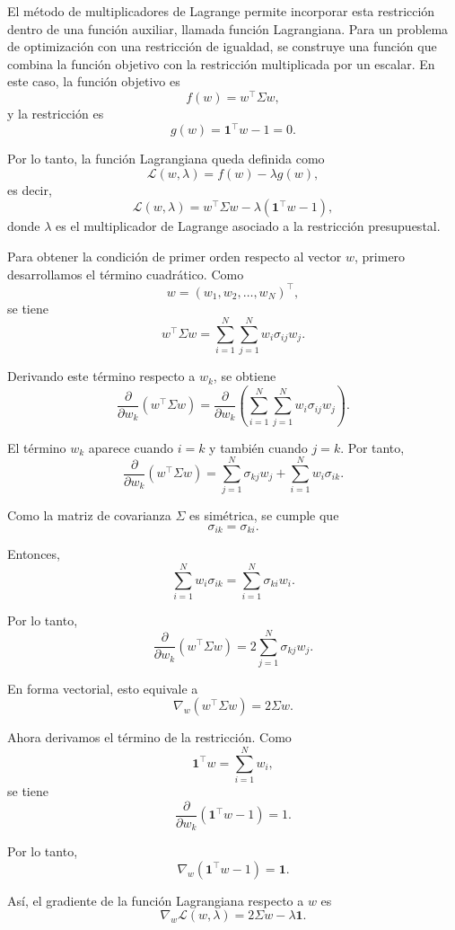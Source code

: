 \documentclass[letterpaper,12pt,oneside]{book}
\begin{document}
El método de multiplicadores de Lagrange permite incorporar esta restricción dentro de una función auxiliar, llamada función Lagrangiana. Para un problema de optimización con una restricción de igualdad, se construye una función que combina la función objetivo con la restricción multiplicada por un escalar. En este caso, la función objetivo es
\[
f(w)=w^\top \Sigma w,
\]
y la restricción es
\[
g(w)=\mathbf{1}^\top w - 1 = 0.
\]

Por lo tanto, la función Lagrangiana queda definida como
\[
\mathcal{L}(w,\lambda)
=
f(w)-\lambda g(w),
\]
es decir,
\[
\mathcal{L}(w,\lambda)
=
w^\top \Sigma w
-
\lambda(\mathbf{1}^\top w - 1),
\]
donde \(\lambda\) es el multiplicador de Lagrange asociado a la restricción presupuestal.

Para obtener la condición de primer orden respecto al vector \(w\), primero desarrollamos el término cuadrático. Como
\[
w =
(w_1,w_2,\dots,w_N)^\top,
\]
se tiene
\[
w^\top \Sigma w
=
\sum_{i=1}^N
\sum_{j=1}^N
w_i \sigma_{ij} w_j.
\]

Derivando este término respecto a \(w_k\), se obtiene
\[
\frac{\partial}{\partial w_k}
\left(
w^\top \Sigma w
\right)
=
\frac{\partial}{\partial w_k}
\left(
\sum_{i=1}^N
\sum_{j=1}^N
w_i \sigma_{ij} w_j
\right).
\]

El término \(w_k\) aparece cuando \(i=k\) y también cuando \(j=k\). Por tanto,
\[
\frac{\partial}{\partial w_k}
\left(
w^\top \Sigma w
\right)
=
\sum_{j=1}^N \sigma_{kj}w_j
+
\sum_{i=1}^N w_i\sigma_{ik}.
\]

Como la matriz de covarianza \(\Sigma\) es simétrica, se cumple que
\[
\sigma_{ik}=\sigma_{ki}.
\]

Entonces,
\[
\sum_{i=1}^N w_i\sigma_{ik}
=
\sum_{i=1}^N \sigma_{ki}w_i.
\]

Por lo tanto,
\[
\frac{\partial}{\partial w_k}
\left(
w^\top \Sigma w
\right)
=
2\sum_{j=1}^N \sigma_{kj}w_j.
\]

En forma vectorial, esto equivale a
\[
\nabla_w
\left(
w^\top \Sigma w
\right)
=
2\Sigma w.
\]

Ahora derivamos el término de la restricción. Como
\[
\mathbf{1}^\top w
=
\sum_{i=1}^N w_i,
\]
se tiene
\[
\frac{\partial}{\partial w_k}
\left(
\mathbf{1}^\top w - 1
\right)
=
1.
\]

Por lo tanto,
\[
\nabla_w
\left(
\mathbf{1}^\top w - 1
\right)
=
\mathbf{1}.
\]

Así, el gradiente de la función Lagrangiana respecto a \(w\) es
\[
\nabla_w \mathcal{L}(w,\lambda)
=
2\Sigma w
-
\lambda \mathbf{1}.
\]
\end{document}

